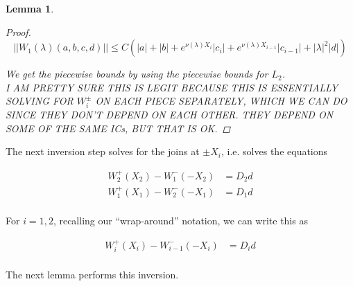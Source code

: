 \documentclass[12pt]{article}
\newtheorem{lemma}{Lemma}
\begin{document}
\begin{lemma}
\begin{proof}
\[
||W_1(\lambda)(a,b,c,d)|| \leq C (|a| + |b| + e^{\nu(\lambda)X_i}|c_i| + e^{\nu(\lambda)X_{i-1}}|c_{i-1}| + |\lambda|^2 |d| )
\]

We get the piecewise bounds by using the piecewise bounds for $L_2$. \\

I AM PRETTY SURE THIS IS LEGIT BECAUSE THIS IS ESSENTIALLY SOLVING FOR $W_i^\pm$ ON EACH PIECE SEPARATELY, WHICH WE CAN DO SINCE THEY DON'T DEPEND ON EACH OTHER. THEY DEPEND ON SOME OF THE SAME ICs, BUT THAT IS OK.

\end{proof}
\end{lemma}

The next inversion step solves for the joins at $\pm X_i$, i.e. solves the equations

\begin{align*}
W_2^+(X_2) - W_1^-(-X_2) &= D_2 d \\
W_1^+(X_1) - W_2^-(-X_1) &= D_1 d \\
\end{align*}

For $i = 1, 2$, recalling our ``wrap-around'' notation, we can write this as

\begin{align*}
W_i^+(X_i) - W_{i-1}^-(-X_i) &= D_i d \\
\end{align*}

The next lemma performs this inversion.

\end{document}
